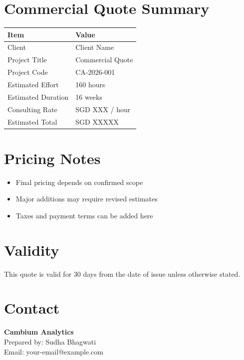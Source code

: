 \documentclass[11pt,a4paper]{article}
\newcommand{\ClientName}{Client Name}
\newcommand{\ProjectTitle}{Commercial Quote}
\newcommand{\ProjectCode}{CA-2026-001}
\newcommand{\PreparedBy}{Sudha Bhagwati}
\newcommand{\EstimatedHours}{160 hours}
\newcommand{\ProjectDuration}{16 weeks}
\begin{document}
\CambiumTitlePage

\section{Commercial Quote Summary}

\begin{tabularx}{\textwidth}{p{6cm}X}
\toprule
\textbf{Item} & \textbf{Value} \\
\midrule
Client & \ClientName \\
Project Title & \ProjectTitle \\
Project Code & \ProjectCode \\
Estimated Effort & \EstimatedHours \\
Estimated Duration & \ProjectDuration \\
Consulting Rate & SGD XXX / hour \\
Estimated Total & SGD XXXXX \\
\bottomrule
\end{tabularx}

\section{Pricing Notes}
\begin{itemize}[leftmargin=1.5em]
    \item Final pricing depends on confirmed scope
    \item Major additions may require revised estimates
    \item Taxes and payment terms can be added here
\end{itemize}

\section{Validity}
This quote is valid for 30 days from the date of issue unless otherwise stated.

\section{Contact}
\textbf{Cambium Analytics}\\
Prepared by: \PreparedBy\\
Email: your-email@example.com
\end{document}
